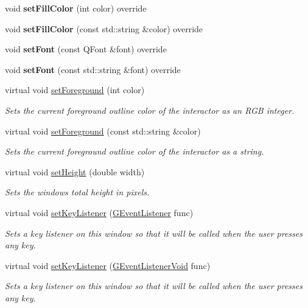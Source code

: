 \begin{DoxyCompactItemize}
void {\bfseries set\+Fill\+Color} (int color) override
\item 
void {\bfseries set\+Fill\+Color} (const std\+::string \&color) override
\item 
void {\bfseries set\+Font} (const Q\+Font \&font) override
\item 
void {\bfseries set\+Font} (const std\+::string \&font) override
\item 
virtual void \mbox{\hyperlink{classsgl_1_1GDrawingSurface_a7daa57084b5811b598fce8726660b328}{set\+Foreground}} (int color)
\begin{DoxyCompactList}\small\item\em Sets the current foreground outline color of the interactor as an R\+GB integer. \end{DoxyCompactList}\item 
virtual void \mbox{\hyperlink{classsgl_1_1GDrawingSurface_af59209aeadea6dfc6d97a2d8531f50e1}{set\+Foreground}} (const std\+::string \&color)
\begin{DoxyCompactList}\small\item\em Sets the current foreground outline color of the interactor as a string. \end{DoxyCompactList}\item 
virtual void \mbox{\hyperlink{classsgl_1_1GWindow_a4b812426e19cdd9f6d62e7b5d90e6bec}{set\+Height}} (double width)
\begin{DoxyCompactList}\small\item\em Sets the window\textquotesingle{}s total height in pixels. \end{DoxyCompactList}\item 
virtual void \mbox{\hyperlink{classsgl_1_1GWindow_aeb8324d3287fa1fbe093f4d6230cf0a6}{set\+Key\+Listener}} (\mbox{\hyperlink{namespacesgl_ae9f3e9eab70035da1a2b114e21357b25}{G\+Event\+Listener}} func)
\begin{DoxyCompactList}\small\item\em Sets a key listener on this window so that it will be called when the user presses any key. \end{DoxyCompactList}\item 
virtual void \mbox{\hyperlink{classsgl_1_1GWindow_ae48ecea73606c7bd9423e1c7cc589cc9}{set\+Key\+Listener}} (\mbox{\hyperlink{namespacesgl_a54427ce97bb1c2804e4fe2b0a62e8b17}{G\+Event\+Listener\+Void}} func)
\begin{DoxyCompactList}\small\item\em Sets a key listener on this window so that it will be called when the user presses any key. \end{DoxyCompactList}\item 

\end{DoxyCompactItemize}

